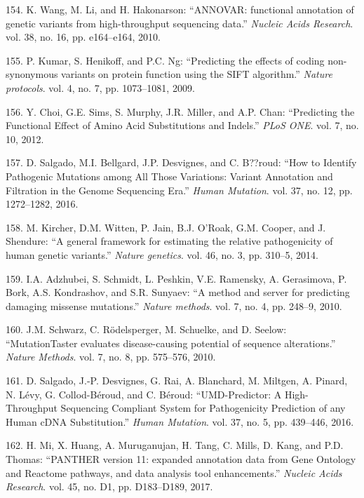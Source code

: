 \documentclass[12pt,a4paper,twoside]{ugathesis}
\theoremstyle{definition}
\theoremstyle{definition}
\theoremstyle{definition}
\theoremstyle{remark}
\begin{document}
\hypertarget{ref-Wang2010}{}
154. K. Wang, M. Li, and H. Hakonarson: ``ANNOVAR: functional annotation
of genetic variants from high-throughput sequencing data.''
\emph{Nucleic Acids Research}. vol. 38, no. 16, pp. e164--e164, 2010.

\hypertarget{ref-Kumar2009}{}
155. P. Kumar, S. Henikoff, and P.C. Ng: ``Predicting the effects of
coding non-synonymous variants on protein function using the SIFT
algorithm.'' \emph{Nature protocols}. vol. 4, no. 7, pp. 1073--1081,
2009.

\hypertarget{ref-Choi2012}{}
156. Y. Choi, G.E. Sims, S. Murphy, J.R. Miller, and A.P. Chan:
``Predicting the Functional Effect of Amino Acid Substitutions and
Indels.'' \emph{PLoS ONE}. vol. 7, no. 10, 2012.

\hypertarget{ref-Salgado2016}{}
157. D. Salgado, M.I. Bellgard, J.P. Desvignes, and C. B??roud: ``How to
Identify Pathogenic Mutations among All Those Variations: Variant
Annotation and Filtration in the Genome Sequencing Era.'' \emph{Human
Mutation}. vol. 37, no. 12, pp. 1272--1282, 2016.

\hypertarget{ref-Kircher2014}{}
158. M. Kircher, D.M. Witten, P. Jain, B.J. O'Roak, G.M. Cooper, and J.
Shendure: ``A general framework for estimating the relative
pathogenicity of human genetic variants.'' \emph{Nature genetics}. vol.
46, no. 3, pp. 310--5, 2014.

\hypertarget{ref-Adzhubei2010}{}
159. I.A. Adzhubei, S. Schmidt, L. Peshkin, V.E. Ramensky, A.
Gerasimova, P. Bork, A.S. Kondrashov, and S.R. Sunyaev: ``A method and
server for predicting damaging missense mutations.'' \emph{Nature
methods}. vol. 7, no. 4, pp. 248--9, 2010.

\hypertarget{ref-Schwarz2010}{}
160. J.M. Schwarz, C. Rödelsperger, M. Schuelke, and D. Seelow:
``MutationTaster evaluates disease-causing potential of sequence
alterations.'' \emph{Nature Methods}. vol. 7, no. 8, pp. 575--576, 2010.

\hypertarget{ref-Salgado2016a}{}
161. D. Salgado, J.-P. Desvignes, G. Rai, A. Blanchard, M. Miltgen, A.
Pinard, N. Lévy, G. Collod-Béroud, and C. Béroud: ``UMD-Predictor: A
High-Throughput Sequencing Compliant System for Pathogenicity Prediction
of any Human cDNA Substitution.'' \emph{Human Mutation}. vol. 37, no. 5,
pp. 439--446, 2016.

\hypertarget{ref-Mi2017}{}
162. H. Mi, X. Huang, A. Muruganujan, H. Tang, C. Mills, D. Kang, and
P.D. Thomas: ``PANTHER version 11: expanded annotation data from Gene
Ontology and Reactome pathways, and data analysis tool enhancements.''
\emph{Nucleic Acids Research}. vol. 45, no. D1, pp. D183--D189, 2017.
\end{document}
